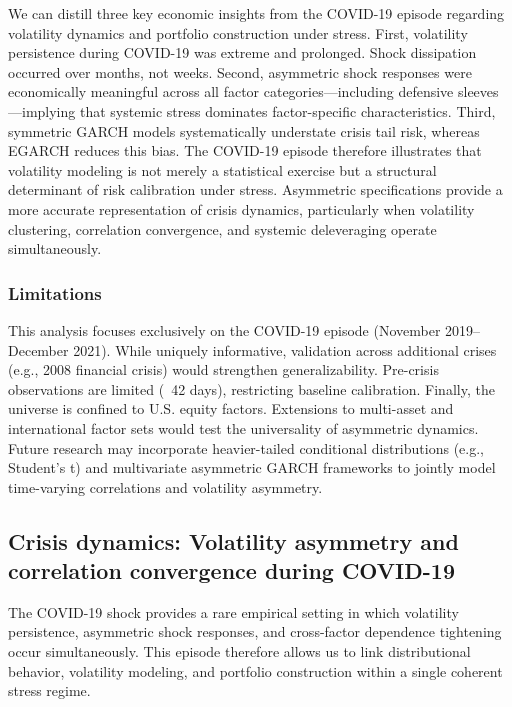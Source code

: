 \documentclass{article}
\begin{document}
We can distill three key economic insights from the COVID-19 episode regarding volatility dynamics and portfolio construction under stress. First, volatility persistence during COVID-19 was extreme and prolonged. Shock dissipation occurred over months, not weeks. Second, asymmetric shock responses were economically meaningful across all factor categories—including defensive sleeves—implying that systemic stress dominates factor-specific characteristics. Third, symmetric GARCH models systematically understate crisis tail risk, whereas EGARCH reduces this bias. The COVID-19 episode therefore illustrates that volatility modeling is not merely a statistical exercise but a structural determinant of risk calibration under stress. Asymmetric specifications provide a more accurate representation of crisis dynamics, particularly when volatility clustering, correlation convergence, and systemic deleveraging operate simultaneously.\newline

\subsubsection{Limitations}

This analysis focuses exclusively on the COVID-19 episode (November 2019–December 2021). While uniquely informative, validation across additional crises (e.g., 2008 financial crisis) would strengthen generalizability. Pre-crisis observations are limited (~42 days), restricting baseline calibration. Finally, the universe is confined to U.S. equity factors. Extensions to multi-asset and international factor sets would test the universality of asymmetric dynamics. Future research may incorporate heavier-tailed conditional distributions (e.g., Student’s t) and multivariate asymmetric GARCH frameworks to jointly model time-varying correlations and volatility asymmetry.\newline

\subsection{Crisis dynamics: Volatility asymmetry and correlation convergence during COVID-19}

The COVID-19 shock provides a rare empirical setting in which volatility persistence, asymmetric shock responses, and cross-factor dependence tightening occur simultaneously. This episode therefore allows us to link distributional behavior, volatility modeling, and portfolio construction within a single coherent stress regime.\newline
\end{document}

